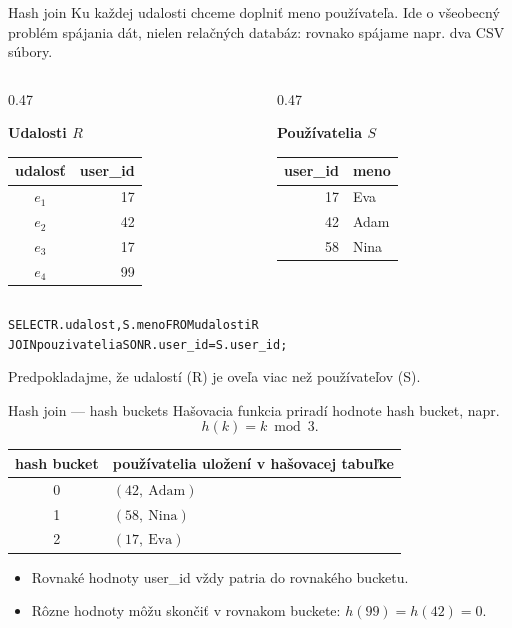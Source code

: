 \documentclass[12pt]{beamer}
\def\blue#1{\textcolor{Cerulean}{#1}}
\begin{document}
\begin{frame}[fragile]{Hash join}
Ku každej udalosti chceme doplniť meno používateľa.
Ide o všeobecný problém spájania dát, nielen relačných databáz: rovnako spájame napr. dva CSV súbory.

\begin{columns}[T]
\begin{column}{0.47\textwidth}
\begin{center}
\textbf{Udalosti $R$}\\[2mm]
\begin{tabular}{c|r}
udalosť & \blue{user\_id} \\ \hline
$e_1$ & 17 \\
$e_2$ & 42 \\
$e_3$ & 17 \\
$e_4$ & 99
\end{tabular}
\end{center}
\end{column}
\begin{column}{0.47\textwidth}
\begin{center}
\textbf{Používatelia $S$}\\[2mm]
\begin{tabular}{r|l}
\blue{user\_id} & meno \\ \hline
17 & Eva \\
42 & Adam \\
58 & Nina
\end{tabular}
\end{center}
\end{column}
\end{columns}

\medskip

{\footnotesize
\begin{alltt}
SELECT R.udalost, S.meno FROM udalosti R
    JOIN pouzivatelia S ON R.\blue{user_id} = S.\blue{user_id};
\end{alltt}
}
Predpokladajme, že udalostí (R) je oveľa viac než používateľov (S).
\end{frame}

\begin{frame}{Hash join --- hash buckets}
Hašovacia funkcia priradí hodnote \alert{hash bucket}, napr.
\[
h(k) = k \bmod 3.
\]

\begin{center}
\begin{tabular}{c|l}
hash bucket & používatelia uložení v hašovacej tabuľke \\ \hline
0 & $(42,\ \text{Adam})$ \\
1 & $(58,\ \text{Nina})$ \\
2 & $(17,\ \text{Eva})$
\end{tabular}
\end{center}

\begin{itemize}
\item Rovnaké hodnoty \blue{user\_id} vždy patria do rovnakého bucketu.
\item Rôzne hodnoty môžu skončiť v rovnakom buckete: $h(99)=h(42)=0$.
\end{itemize}
\end{frame}
\end{document}
